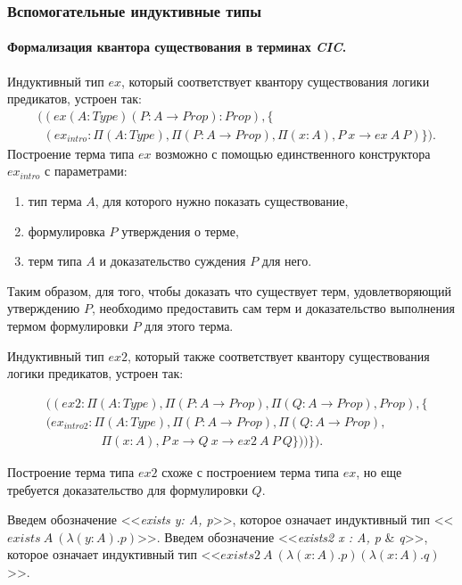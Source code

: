 \documentclass[12pt]{article}
\begin{document}
\subsubsection{Вспомогательные индуктивные типы}

\paragraph{Формализация квантора существования в терминах \textit{CIC}.}\mbox{}

Индуктивный тип $ex$, который соответствует квантору существования логики предикатов, устроен так:
\begin{align*}
& ((ex(A:Type)(P:A\xrightarrow{}Prop):Prop), \{ \\ 
& \ \ (ex_{intro} : \Pi (A:Type),\Pi (P:A\xrightarrow{}Prop), \Pi(x:A), P\ x \xrightarrow{} ex\ A\ P) \}).
\end{align*}
Построение терма типа $ex$ возможно с помощью единственного конструктора $ex_{intro}$ с параметрами: 
\begin{enumerate}
    \item тип терма $A$, для которого нужно показать существование,
    \item формулировка $P$ утверждения о терме,
    \item терм типа $A$ и доказательство суждения $P$ для него.
\end{enumerate}

Таким образом, для того, чтобы доказать что существует терм, удовлетворяющий утверждению $P$, необходимо предоставить сам терм и доказательство выполнения термом формулировки $P$ для этого терма.

Индуктивный тип $ex2$, который также соответствует квантору существования логики предикатов, устроен так:

\begin{align*}
& ((ex2:\Pi(A:Type),\Pi(P:A\xrightarrow{}Prop),\Pi(Q:A\xrightarrow{}Prop),Prop), \{ \\ 
& (ex_{intro2} : \Pi (A:Type),\Pi (P:A\xrightarrow{}Prop),\Pi(Q:A\xrightarrow{}Prop),\\ & 
\ \ \ \ \ \ \ \ \ \ \ \ \ \ \ \ \ \ \ \ \Pi(x:A), P\ x \xrightarrow{} Q\ x \xrightarrow{} ex2\ A\ P\ Q\})) \}).
\end{align*}

Построение терма типа $ex2$ схоже с построением терма типа $ex$, но еще требуется доказательство для формулировки $Q$.

Введем обозначение <<\textit{exists y: A, p}>>, которое означает индуктивный тип <<$exists\ A\ (\lambda (y:A).p)$>>. Введем обозначение  <<\textit{exists2 x : A, p} \& \textit{q}>>, которое означает индуктивный тип
<<$exists2\ A\ (\lambda (x:A). p) (\lambda (x:A). q)$>>.
\end{document}
